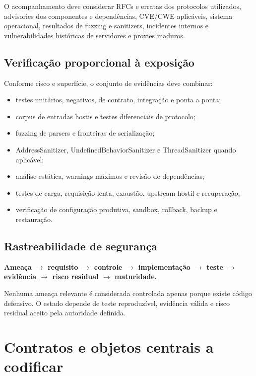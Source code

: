 \documentclass[11pt,a4paper,oneside]{article}
\begin{document}
O acompanhamento deve considerar RFCs e erratas dos protocolos utilizados, advisories dos componentes e dependências, CVE/CWE aplicáveis, sistema operacional, resultados de fuzzing e sanitizers, incidentes internos e vulnerabilidades históricas de servidores e proxies maduros.

\subsection{Verificação proporcional à exposição}
Conforme risco e superfície, o conjunto de evidências deve combinar:
\begin{itemize}
  \item testes unitários, negativos, de contrato, integração e ponta a ponta;
  \item corpus de entradas hostis e testes diferenciais de protocolo;
  \item fuzzing de parsers e fronteiras de serialização;
  \item AddressSanitizer, UndefinedBehaviorSanitizer e ThreadSanitizer quando aplicável;
  \item análise estática, warnings máximos e revisão de dependências;
  \item testes de carga, requisição lenta, exaustão, upstream hostil e recuperação;
  \item verificação de configuração produtiva, sandbox, rollback, backup e restauração.
\end{itemize}

\subsection{Rastreabilidade de segurança}
\begin{principio}
\centering
\textbf{Ameaça $\rightarrow$ requisito $\rightarrow$ controle $\rightarrow$ implementação $\rightarrow$ teste $\rightarrow$ evidência $\rightarrow$ risco residual $\rightarrow$ maturidade.}
\end{principio}

Nenhuma ameaça relevante é considerada controlada apenas porque existe código defensivo. O estado depende de teste reproduzível, evidência válida e risco residual aceito pela autoridade definida.

\section{Contratos e objetos centrais a codificar}
\end{document}
